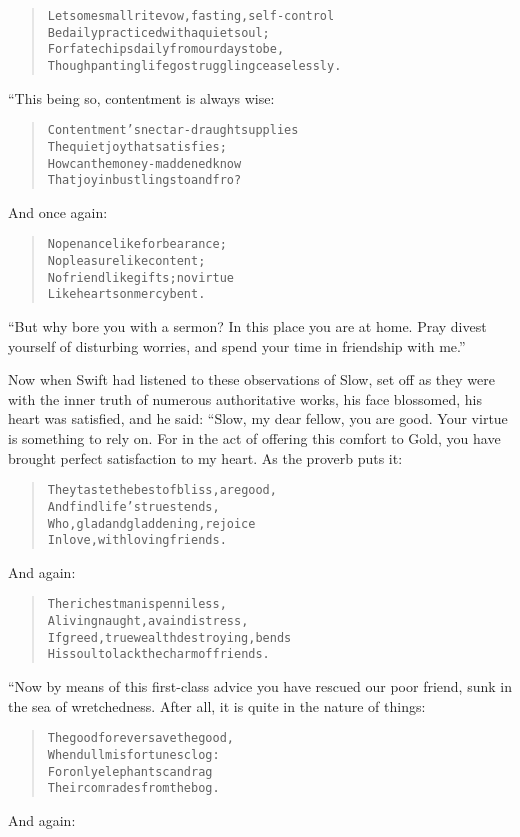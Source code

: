 \documentclass[article, twoside, 14pt]{memoir}
\renewenvironment{verbatim}{%
\begin{quote}%
\vskip -10pt%
\begin{alltt}\normalfont\large}{\end{alltt}%
\end{quote}%
\vskip -10pt
} %
\begin{document}
\begin{verbatim}
Let some small rite{\textemdash}vow, fasting, self-control{\textemdash}
Be daily practiced with a quiet soul;
For fate chips daily from our days to be,
Though panting life go struggling ceaselessly.
\end{verbatim}
“This being so, contentment is always wise:

\begin{verbatim}
Contentment's nectar-draught supplies
The quiet joy that satisfies;
How can the money-maddened know
That joy in bustlings to and fro?
\end{verbatim}
And once again:

\begin{verbatim}
No penance like forbearance;
    No pleasure like content;
No friend like gifts; no virtue
    Like hearts on mercy bent.
\end{verbatim}
``But why bore you with a sermon? In this place you are at home. Pray divest yourself of disturbing worries, and spend your time in friendship with me.''

Now when Swift had listened to these observations of Slow, set off
as they were with the inner truth of numerous authoritative works,
his face blossomed, his heart was satisfied, and he said: “Slow, my
dear fellow, you are good. Your virtue is something to rely on. For
in the act of offering this comfort to Gold, you have brought
perfect satisfaction to my heart. As the proverb puts it:

\begin{verbatim}
They taste the best of bliss, are good,
    And find life's truest ends,
Who, glad and gladdening, rejoice
    In love, with loving friends.
\end{verbatim}
And again:

\begin{verbatim}
The richest man is penniless,
A living naught, a vain distress,
If greed, true wealth destroying, bends
His soul to lack the charm of friends.
\end{verbatim}
“Now by means of this first-class advice you have rescued our poor
friend, sunk in the sea of wretchedness. After all, it is quite in
the nature of things:

\begin{verbatim}
The good forever save the good,
    When dull misfortunes clog:
For only elephants can drag
    Their comrades from the bog.
\end{verbatim}
And again:
\end{document}
